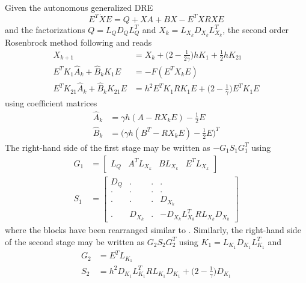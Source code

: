 Given the autonomous generalized DRE
\begin{equation*}
  E^T \dot{X} E = Q + XA + BX - E^T X R X E
\end{equation*}
and the factorizations $ Q = L_Q D_Q L_Q^T $ and $ X_k = L_{X_k} D_{X_k} L_{X_k}^T $,
the second order Rosenbrock method following \cite{Verwer1999} and \cite{Mena2007} reads
\begin{subequations}
\label{eq:lang:stages}
\begin{align}
  X_{k+1} &= X_k + \big( 2 - \tfrac{1}{2\gamma}\big) h K_1 + \tfrac{1}{2} h K_{21} \\
  E^T K_1 \hat{A}_k + \hat{B}_k K_1 E &= -F(E^T X_k E) \\
  E^T K_{21} \hat{A}_k + \hat{B}_k K_{21} E &= h^2 E^T K_1 R K_1 E + \big(2-\tfrac{1}{\gamma}\big) E^T K_1 E
\end{align}
\end{subequations}
using coefficient matrices
\begin{align*}
  \hat{A}_k &= \gamma h (A - R X_k E) - \tfrac{1}{2} E \\
  \hat{B}_k &= \big( \gamma h (B^T - R X_k E) - \tfrac{1}{2} E \big)^T
\end{align*}
The right-hand side of the first stage may be written as $-G_1 S_1 G_1^T$ using
\begin{subequations}
\begin{align}
  G_1 &= \begin{bmatrix}
    L_Q & A^T L_{X_k} & B L_{X_k} & E^T L_{X_k}
  \end{bmatrix} \\
  \label{eq:lang:asymmetric S}
  S_1 &= \begin{bmatrix}
    D_Q &.&.&. \\
    .&.&.&.\\
    .&.&.& D_{X_k} \\
    .& D_{X_k} & . & -D_{X_k} L_{X_k}^T R L_{X_k} D_{X_k}
  \end{bmatrix}
\end{align}
\end{subequations}
where the blocks have been rearranged similar to \cite[60]{Lang2015}.
Similarly, the right-hand side of the second stage may be written as $G_2 S_2 G_2^T$ using
$K_1 = L_{K_1} D_{K_1} L_{K_1}^T$ and
\begin{align*}
  G_2 &= E^T L_{K_1} \\
  S_2 &= h^2 D_{K_1} L_{K_1}^T R L_{K_1} D_{K_1} + \big(2-\tfrac{1}{\gamma}\big) D_{K_1}
\end{align*}

